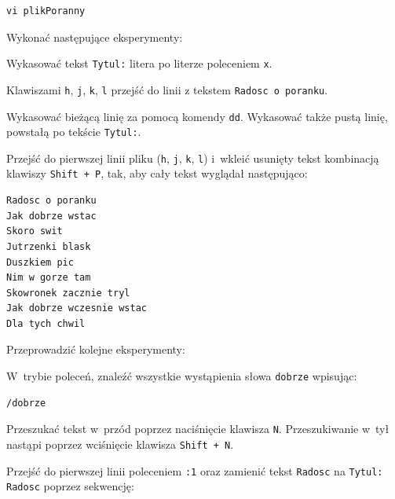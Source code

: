 \begin{example}
\begin{lstlisting}[style=MyBashStyle]
vi plikPoranny
\end{lstlisting}

Wykonać następujące eksperymenty:

\begin{myitemize}
\item Wykasować tekst \lstinline[style=MyBashStyle]{Tytul:} litera po literze poleceniem \lstinline[style=MyBashStyle]{x}.
\item Klawiszami \lstinline[style=MyBashStyle]{h}, \lstinline[style=MyBashStyle]{j}, \lstinline[style=MyBashStyle]{k}, \lstinline[style=MyBashStyle]{l} przejść do linii z tekstem \lstinline[style=MyBashStyle]{Radosc o poranku}.
\item Wykasować bieżącą linię za pomocą komendy \lstinline[style=MyBashStyle]{dd}. Wykasować także pustą linię, powstałą po tekście \lstinline[style=MyBashStyle]{Tytul:}.
\item Przejść do pierwszej linii pliku (\lstinline[style=MyBashStyle]{h}, \lstinline[style=MyBashStyle]{j}, \lstinline[style=MyBashStyle]{k}, \lstinline[style=MyBashStyle]{l}) i~wkleić usunięty tekst kombinacją klawiszy \lstinline[style=MyBashStyle]{Shift + P}, tak, aby cały tekst wyglądał następująco:
\end{myitemize}

\begin{lstlisting}[style=MyBashStyle]
Radosc o poranku
Jak dobrze wstac
Skoro swit
Jutrzenki blask
Duszkiem pic
Nim w gorze tam
Skowronek zacznie tryl
Jak dobrze wczesnie wstac
Dla tych chwil
\end{lstlisting}

Przeprowadzić kolejne eksperymenty:

\begin{myitemize}
\item W~trybie poleceń, znaleźć wszystkie wystąpienia słowa \lstinline[style=MyBashStyle]{dobrze} wpisując:
\end{myitemize}

\begin{lstlisting}[style=MyBashStyle]
/dobrze
\end{lstlisting}
\begin{myitemize}
\item Przeszukać tekst w~przód poprzez naciśnięcie klawisza \lstinline[style=MyBashStyle]{N}. Przeszukiwanie w~tył nastąpi poprzez wciśnięcie klawisza \lstinline[style=MyBashStyle]{Shift + N}.
\item Przejść do pierwszej linii poleceniem \lstinline[style=MyBashStyle]{:1} oraz zamienić tekst \lstinline[style=MyBashStyle]
{Radosc} na \lstinline[style=MyBashStyle]{Tytul: Radosc} poprzez sekwencję:
\end{myitemize}


\end{example}

